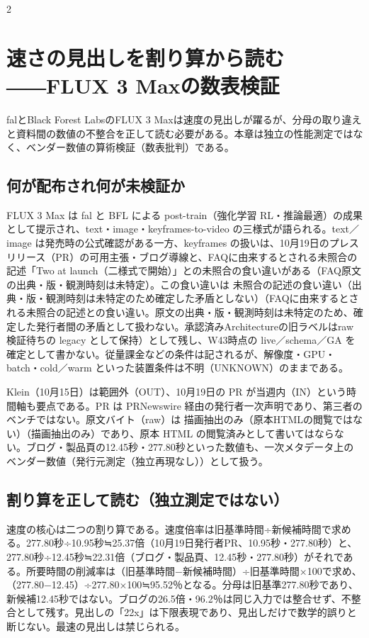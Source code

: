 \documentclass[lualatex,a4paper,10pt]{jlreq}
\begin{document}
\begin{multicols}{2} %


\section{速さの見出しを割り算から読む――FLUX 3 Maxの数表検証}
\label{sec:P4}


falとBlack Forest LabsのFLUX 3 Maxは速度の見出しが躍るが、分母の取り違えと資料間の数値の不整合を正して読む必要がある。本章は独立の性能測定ではなく、ベンダー数値の算術検証（数表批判）である。


\subsection*{何が配布され何が未検証か}


FLUX 3 Max は fal と BFL による post-train（強化学習 RL・推論最適）の成果として提示され、text・image・keyframes-to-video の三様式が語られる。text／image は発売時の公式確認がある一方、keyframes の扱いは、10月19日のプレスリリース（PR）の可用主張・ブログ導線と、FAQに由来するとされる未照合の記述「Two at launch（二様式で開始）」との未照合の食い違いがある（FAQ原文の出典・版・観測時刻は未特定）。この食い違いは 未照合の記述の食い違い（出典・版・観測時刻は未特定のため確定した矛盾としない）（FAQに由来するとされる未照合の記述との食い違い。原文の出典・版・観測時刻は未特定のため、確定した発行者間の矛盾として扱わない。承認済みArchitectureの旧ラベルはraw検証待ちの legacy として保持）として残し、W43時点の live／schema／GA を確定として書かない。従量課金などの条件は記されるが、解像度・GPU・batch・cold／warm といった装置条件は不明（UNKNOWN）のままである。


Klein（10月15日）は範囲外（OUT）、10月19日の PR が当週内（IN）という時間軸も要点である。PR は PRNewswire 経由の発行者一次声明であり、第三者のベンチではない。原文バイト（raw）は 描画抽出のみ（原本HTMLの閲覧ではない）（描画抽出のみ）であり、原本 HTML の閲覧済みとして書いてはならない。ブログ・製品頁の12.45秒・277.80秒といった数値も、一次メタデータ上のベンダー数値（発行元測定（独立再現なし））として扱う。


\subsection*{割り算を正して読む（独立測定ではない）}


速度の核心は二つの割り算である。速度倍率は旧基準時間÷新候補時間で求める。277.80秒÷10.95秒≒25.37倍（10月19日発行者PR、10.95秒・277.80秒）と、277.80秒÷12.45秒≒22.31倍（ブログ・製品頁、12.45秒・277.80秒）がそれである。所要時間の削減率は（旧基準時間−新候補時間）÷旧基準時間×100で求め、（277.80−12.45）÷277.80×100≒95.52％となる。分母は旧基準277.80秒であり、新候補12.45秒ではない。ブログの26.5倍・96.2％は同じ入力では整合せず、不整合として残す。見出しの「22x」は下限表現であり、見出しだけで数学的誤りと断じない。最速の見出しは禁じられる。


\end{multicols} %
\end{document}
